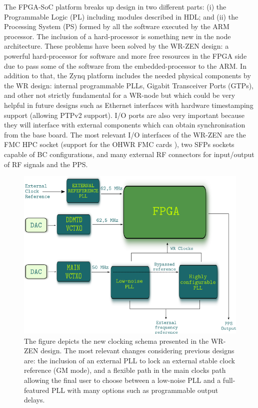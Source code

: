 The FPGA-SoC platform breaks up design in two different parts: (i) the
Programmable Logic (PL) including modules described in HDL; and (ii) the
Processing System (PS) formed by all the software executed by the ARM
processor.  The inclusion of a hard-processor is something new in the node
architecture.  These problems have been solved by the WR-ZEN design: a powerful
hard-processor for software and more free resources in the FPGA side due to
pass some of the software from the embedded-processor to the ARM. In addition
to that, the Zynq platform includes the needed physical components by the WR
design: internal programmable PLLs, Gigabit Transceiver Ports (GTPs), and other
not strictly fundamental for a WR-node but which could be very helpful in
future designs such as Ethernet interfaces with hardware timestamping support
(allowing PTPv2 support). I/O ports are also very important because they will
interface with external components which can obtain synchronisation from the
base board. The most relevant I/O interfaces of the WR-ZEN are the FMC HPC
socket (support for the OHWR \cite{ohwr:repo} FMC cards
\cite{ohwr:fmc-fine-delay}), two SFPs sockets capable of BC configurations, and
many external RF connectors for input/output of RF signals and the PPS.

\begin{figure} \centering
	\includegraphics[width=0.7\linewidth]{img/zenclkschema} \caption[WR-ZEN
	clocking schema]{The figure depicts the new clocking schema presented
	in the WR-ZEN design. The most relevant changes considering previous
	designs are: the inclusion of an external PLL to lock an external
	stable clock reference (GM mode), and a flexible path in the main
	clocks path allowing the final user to choose between a low-noise PLL
	and a full-featured PLL with many options such as programmable output
delays.} \label{fig:zenclkschema} \end{figure}

